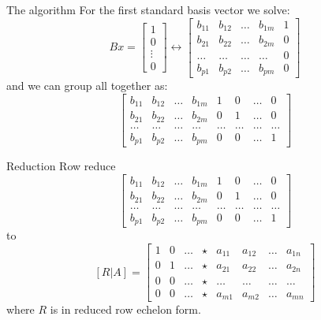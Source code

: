 \documentclass{beamer}
\begin{document}
\begin{frame}{The algorithm}
  For the first standard basis vector we solve:
  \begin{equation*}
    Bx = \left[
      \begin{array}{c}
        1\\
        0\\
        \vdots\\
        0
      \end{array}
    \right]\leftrightarrow
    \left[
      \begin{array}{cccc|c}
        b_{11} & b_{12} & \dots & b_{1m} & 1\\
        b_{21} & b_{22} & \dots & b_{2m} & 0\\
        \dots & \dots & \dots & \dots & 0\\
        b_{p1} & b_{p2} & \dots & b_{pm} & 0
      \end{array}
    \right]
  \end{equation*}
  and we can group all together as:
  \begin{equation*}
    \left[
    \begin{array}{cccc|cccc}
      b_{11} & b_{12} & \dots & b_{1m} & 1 & 0 & \dots & 0\\
      b_{21} & b_{22} & \dots & b_{2m} & 0 & 1 & \dots & 0\\
      \dots & \dots & \dots & \dots & \dots & \dots & \dots & \dots\\
      b_{p1} & b_{p2} & \dots & b_{pm} &0 & 0 & \dots & 1
    \end{array}
    \right]
  \end{equation*}
\end{frame}

\begin{frame}{Reduction}
  Row reduce
  \begin{equation*}
    \left[
    \begin{array}{cccc|cccc}
      b_{11} & b_{12} & \dots & b_{1m} & 1 & 0 & \dots & 0\\
      b_{21} & b_{22} & \dots & b_{2m} & 0 & 1 & \dots & 0\\
      \dots & \dots & \dots & \dots & \dots & \dots & \dots & \dots\\
      b_{p1} & b_{p2} & \dots & b_{pm} &0 & 0 & \dots & 1
    \end{array}
    \right]
  \end{equation*}
  to
  \begin{equation*}
    \left[R|A\right]=
    \left[
      \begin{array}{cccc|cccc}
        1 & 0 & \dots & \star & a_{11} & a_{12} &\dots & a_{1n}\\
        0 & 1 & \dots & \star & a_{21} & a_{22} &\dots & a_{2n}\\
        0 & 0 & \dots & \star & \dots & \dots &\dots & \dots\\
        0 & 0 & \dots & \star & a_{m1} & a_{m2} &\dots & a_{mn}
      \end{array}
    \right]
  \end{equation*}
  where $R$ is in reduced row echelon form.
\end{frame}
\end{document}
